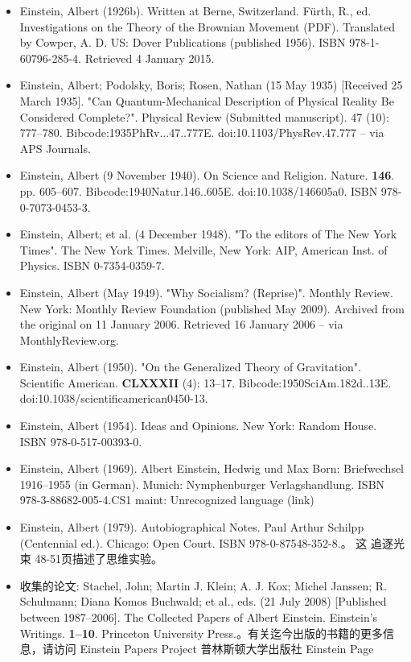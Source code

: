 \begin{itemize}
\item Einstein, Albert (1926b). Written at Berne, Switzerland. Fürth, R., ed. Investigations on the Theory of the Brownian Movement (PDF). Translated by Cowper, A. D. US: Dover Publications (published 1956). ISBN 978-1-60796-285-4. Retrieved 4 January 2015.
\item Einstein, Albert; Podolsky, Boris; Rosen, Nathan (15 May 1935) [Received 25 March 1935]. "Can Quantum-Mechanical Description of Physical Reality Be Considered Complete?". Physical Review (Submitted manuscript). 47 (10): 777–780. Bibcode:1935PhRv...47..777E. doi:10.1103/PhysRev.47.777 – via APS Journals.
\item Einstein, Albert (9 November 1940). On Science and Religion. Nature. \textbf{146}. pp. 605–607. Bibcode:1940Natur.146..605E. doi:10.1038/146605a0. ISBN 978-0-7073-0453-3.
\item Einstein, Albert; et al. (4 December 1948). "To the editors of The New York Times". The New York Times. Melville, New York: AIP, American Inst. of Physics. ISBN 0-7354-0359-7.
\item Einstein, Albert (May 1949). "Why Socialism? (Reprise)". Monthly Review. New York: Monthly Review Foundation (published May 2009). Archived from the original on 11 January 2006. Retrieved 16 January 2006 – via MonthlyReview.org.
\item Einstein, Albert (1950). "On the Generalized Theory of Gravitation". Scientific American. \textbf{CLXXXII} (4): 13–17. Bibcode:1950SciAm.182d..13E. doi:10.1038/scientificamerican0450-13.
\item Einstein, Albert (1954). Ideas and Opinions. New York: Random House. ISBN 978-0-517-00393-0.
\item Einstein, Albert (1969). Albert Einstein, Hedwig und Max Born: Briefwechsel 1916–1955 (in German). Munich: Nymphenburger Verlagshandlung. ISBN 978-3-88682-005-4.CS1 maint: Unrecognized language (link)
\item Einstein, Albert (1979). Autobiographical Notes. Paul Arthur Schilpp (Centennial ed.). Chicago: Open Court. ISBN 978-0-87548-352-8.。 这 追逐光束 48-51页描述了思维实验。
\item 收集的论文: Stachel, John; Martin J. Klein; A. J. Kox; Michel Janssen; R. Schulmann; Diana Komos Buchwald; et al., eds. (21 July 2008) [Published between 1987–2006]. The Collected Papers of Albert Einstein. Einstein's Writings. \textbf{1–10}. Princeton University Press.。有关迄今出版的书籍的更多信息，请访问 Einstein Papers Project 普林斯顿大学出版社 Einstein Page
\end{itemize}

